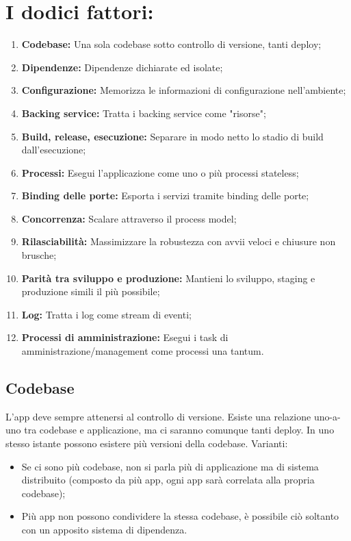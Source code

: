 \documentclass[PianoDiQualifica.tex]{subfiles}
\begin{document}
\section{I dodici fattori:}
\begin{enumerate}
\item \textbf{Codebase:} Una sola codebase sotto controllo di versione, tanti deploy;
\item \textbf{Dipendenze:} Dipendenze dichiarate ed isolate;
\item \textbf{Configurazione:} Memorizza le informazioni di configurazione nell'ambiente;
\item \textbf{Backing service:} Tratta i backing service come "risorse";
\item \textbf{Build, release, esecuzione:} Separare in modo netto lo stadio di build dall'esecuzione;
\item \textbf{Processi:} Esegui l'applicazione come uno o più processi stateless;
\item \textbf{Binding delle porte:} Esporta i servizi tramite binding delle porte;
\item \textbf{Concorrenza:} Scalare attraverso il process model;
\item \textbf{Rilasciabilità:} Massimizzare la robustezza con avvii veloci e chiusure non brusche;
\item \textbf{Parità tra sviluppo e produzione:} Mantieni lo sviluppo, staging e produzione simili il più possibile;
\item \textbf{Log:} Tratta i log come stream di eventi;
\item \textbf{Processi di amministrazione:} Esegui i task di amministrazione/management come processi una tantum.
\end{enumerate}

\subsection{Codebase}
L'app deve sempre attenersi al controllo di versione. Esiste una relazione uno-a-uno tra codebase e applicazione, ma ci saranno comunque tanti deploy. In uno stesso istante possono esistere più versioni della codebase.
Varianti:
\begin{itemize}
\item Se ci sono più codebase, non si parla più di applicazione ma di sistema distribuito (composto da più app, ogni app sarà correlata alla propria codebase);
\item Più app non possono condividere la stessa codebase, è possibile ciò soltanto con un apposito sistema di dipendenza.
\end{itemize}
\end{document}
